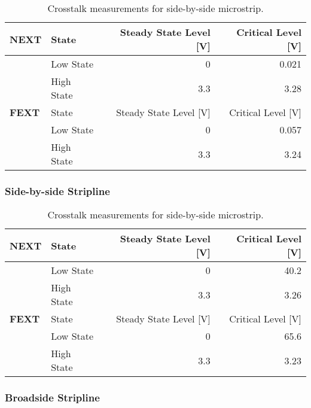 \documentclass[../main.tex]{subfiles}
\begin{document}
\begin{table}[h]
    \centering
    \begin{tabular}{l l|r r}
        \toprule[1pt]
        \textbf{NEXT} & State & Steady State Level [V] & Critical Level [V] \\
        \midrule
        & Low State & 0 & 0.021 \\
        & High State & 3.3 & 3.28 \\
        \midrule[1pt]
        \textbf{FEXT} & State & Steady State Level [V] & Critical Level [V] \\
        \midrule
        & Low State & 0 & 0.057 \\
        & High State & 3.3 & 3.24 \\
        \bottomrule[1pt]
    \end{tabular}
    \caption{Crosstalk measurements for side-by-side microstrip.}
    \label{tab:sim-side-by-side-microstrip}
\end{table}

\subsubsection{Side-by-side Stripline}

\begin{table}[h]
    \centering
    \begin{tabular}{l l|r r}
        \toprule[1pt]
        \textbf{NEXT} & State & Steady State Level [V] & Critical Level [V] \\
        \midrule
        & Low State & 0 & 40.2 \\
        & High State & 3.3 & 3.26 \\
        \midrule[1pt]
        \textbf{FEXT} & State & Steady State Level [V] & Critical Level [V] \\
        \midrule
        & Low State & 0 & 65.6 \\
        & High State & 3.3 & 3.23 \\
        \bottomrule[1pt]
    \end{tabular}
    \caption{Crosstalk measurements for side-by-side microstrip.}
    \label{tab:sim-side-by-side-stripline}
\end{table}

\subsubsection{Broadside Stripline}
\end{document}
